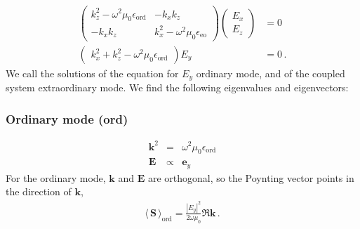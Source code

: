 \documentclass[12pt,a4paper,twoside,openright,BCOR10mm,headsepline,titlepage,abstracton,chapterprefix,final]{scrreprt}
\newcommand\Vector[1]{{\mathbf{#1}}}
\newcommand\vacuum{0}
\newcommand\wavenumber{k}
\newcommand\Wavevector{\Vector{\wavenumber}}
\newcommand\scalarEfield{E}
\newcommand\Efield{\Vector{\scalarEfield}}
\newcommand\vacuumpermeability{\mu_{\vacuum}}
\newcommand\scalarpermittivity{\epsilon}
\newcommand\ordi{\text{ord}}
\newcommand\eo{\text{eo}}
\newcommand{\timeavg}[1]{{\langle\,#1\,\rangle}}
\begin{document}
\begin{align}
\begin{pmatrix}
 \wavenumber_z^2 - \omega^2 \vacuumpermeability \scalarpermittivity_{\ordi} 
 &
 - \wavenumber_x \wavenumber_z 
 \\
 - \wavenumber_x \wavenumber_z 
 &
 \wavenumber_x^2 - \omega^2 \vacuumpermeability \scalarpermittivity_{\eo}  
\end{pmatrix} 
\begin{pmatrix}
 \scalarEfield_x 
 \\
 \scalarEfield_z
\end{pmatrix}
&= 0
\\
\begin{pmatrix} \wavenumber_x^2 + \wavenumber_z^2 - \omega^2 \vacuumpermeability \scalarpermittivity_{\ordi} \end{pmatrix} \scalarEfield_y &= 0\,.
\end{align}
We call the solutions of the equation for $\scalarEfield_y$ ordinary mode, and of the coupled system extraordinary mode.
We find the following eigenvalues and eigenvectors:
\subsubsection{Ordinary mode (ord)}

\begin{eqnarray}
 \Wavevector^2 &=& \omega^2 \vacuumpermeability \scalarpermittivity_{\ordi} 
 \\
 \Efield &\propto& \Vector{e}_y
\end{eqnarray}
For the ordinary mode, $\Wavevector$ and $\Efield$ are orthogonal, so the Poynting vector points in the direction of $\Wavevector$,
\begin{eqnarray}
 \timeavg{\Vector{S}}_\ordi = \frac{ |\scalarEfield_y|^2 }{ 2\omega\vacuumpermeability } \Re \Wavevector\,.\label{eq:Suniaxialordi}
\end{eqnarray}
\end{document}
